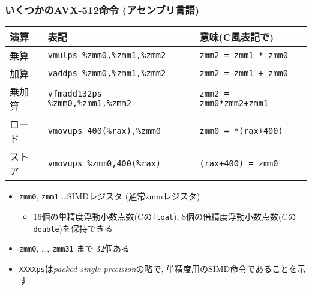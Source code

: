 \documentclass[10pt,dvipdfmx]{beamer}
\newcommand{\ao}[1]{{\color{blue}#1}}
\begin{document}
\begin{frame}
  \frametitle{いくつかのAVX-512命令 (アセンブリ言語)}

\begin{center}
{\footnotesize
\begin{tabular}{|l|l|l|}\hline
演算   & 表記                         & 意味(C風表記で) \\\hline
乗算   & {\tt \ao{vmulps} \%zmm0,\%zmm1,\%zmm2} & {\tt zmm2 = zmm1 * zmm0} \\
加算   & {\tt \ao{vaddps} \%zmm0,\%zmm1,\%zmm2} & {\tt zmm2 = zmm1 + zmm0} \\
乗加算 & {\tt \ao{vfmadd132ps} \%zmm0,\%zmm1,\%zmm2} & {\tt zmm2 = zmm0*zmm2+zmm1} \\
ロード  & {\tt \ao{vmovups} 400(\%rax),\%zmm0}   & {\tt zmm0 = *(rax+400)} \\
ストア  & {\tt \ao{vmovups} \%zmm0,400(\%rax)}   & {\tt *(rax+400) = zmm0} \\
\hline
\end{tabular}}
\end{center}

\begin{itemize}

\item \texttt{zmm0}, \texttt{zmm1} \ldots SIMDレジスタ (通常zmmレジスタ)
  \begin{itemize}
  \item 16個の単精度浮動小数点数(Cの\texttt{float}),
    8個の倍精度浮動小数点数(Cの\texttt{double})を保持できる
  \end{itemize}
\item \texttt{zmm0}, \ldots , \texttt{zmm31} まで 32個ある 
\item {\tt XXXX\ao{ps}}は{\em \ao{p}acked \ao{s}ingle precision}の略で,
  単精度用のSIMD命令であることを示す
\end{itemize}
\end{frame}
\end{document}

